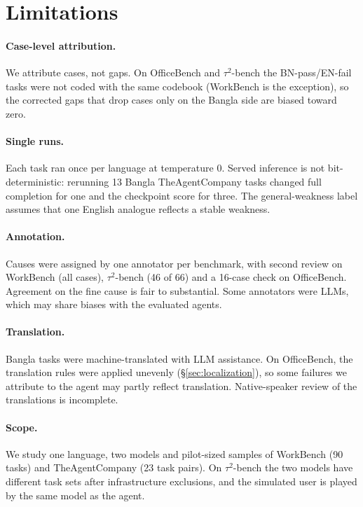 \documentclass[11pt]{article}
\newcommand{\OB}{OfficeBench}
\newcommand{\WB}{WorkBench}
\newcommand{\TAU}{$\tau^2$-bench}
\newcommand{\TAC}{TheAgentCompany}
\begin{document}
\section*{Limitations}

\paragraph{Case-level attribution.} We attribute cases, not gaps. On \OB{} and \TAU{} the
BN-pass/EN-fail tasks were not coded with the same codebook (\WB{} is the exception), so the
corrected gaps that drop cases only on the Bangla side are biased toward zero.

\paragraph{Single runs.} Each task ran once per language at temperature 0. Served inference is
not bit-deterministic: rerunning 13 Bangla \TAC{} tasks changed full completion for one and the
checkpoint score for three. The
general-weakness label assumes that one English analogue reflects a stable weakness.

\paragraph{Annotation.} Causes were assigned by one annotator per benchmark, with second review on
\WB{} (all cases), \TAU{} (46 of 66) and a 16-case check on \OB{}. Agreement on the fine cause is
fair to substantial. Some annotators were LLMs, which may share biases with the evaluated agents.

\paragraph{Translation.} Bangla tasks were machine-translated with LLM assistance. On \OB{}, the
translation rules were applied unevenly (\S\ref{sec:localization}), so some failures we attribute
to the agent may partly reflect translation. Native-speaker review of the translations is
incomplete.

\paragraph{Scope.} We study one language, two models and pilot-sized samples of \WB{} (90 tasks)
and \TAC{} (23 task pairs). On \TAU{} the two models have different task sets after infrastructure
exclusions, and the simulated user is played by the same model as the agent.
\end{document}
